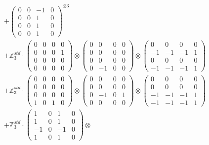 \documentclass{article}
\begin{document}
{\begin{align}
        &+ \label{Rs16-Rc11-Solution-27-c16} \begin{pmatrix} 0 & 0 & -1 & 0 \\ 0 & 0 & 1 & 0 \\ 0 & 0 & 1 & 0 \\ 0 & 0 & 1 & 0 \end{pmatrix}^{\otimes 3} \\
        &+ \label{Rs16-Rc11-Solution-27-c17} \mathbb{Z}_3^{std} \cdot 
            \begin{pmatrix} 0 & 0 & 0 & 0 \\ 0 & 0 & 0 & 1 \\ 0 & 0 & 0 & 0 \\ 0 & 0 & 0 & 0 \end{pmatrix} \otimes 
            \begin{pmatrix} 0 & 0 & 0 & 0 \\ 0 & 0 & 0 & 0 \\ 0 & 0 & 0 & 0 \\ 0 & -1 & 0 & 0 \end{pmatrix} \otimes 
            \begin{pmatrix} 0 & 0 & 0 & 0 \\ -1 & -1 & -1 & 1 \\ 0 & 0 & 0 & 0 \\ -1 & -1 & -1 & 1 \end{pmatrix} \\ 
        &+ \label{Rs16-Rc11-Solution-27-c18} \mathbb{Z}_3^{std} \cdot 
            \begin{pmatrix} 0 & 0 & 0 & 0 \\ 0 & 0 & 0 & 0 \\ 0 & 0 & 0 & 0 \\ 1 & 0 & 1 & 0 \end{pmatrix} \otimes 
            \begin{pmatrix} 0 & 0 & 0 & 0 \\ 0 & 0 & 0 & 0 \\ 0 & -1 & 0 & 1 \\ 0 & 0 & 0 & 0 \end{pmatrix} \otimes 
            \begin{pmatrix} 0 & 0 & 0 & 0 \\ 0 & 0 & 0 & 0 \\ -1 & -1 & -1 & 1 \\ -1 & -1 & -1 & 1 \end{pmatrix} \\ 
        &+ \label{Rs16-Rc11-Solution-27-c19} \mathbb{Z}_3^{std} \cdot 
            \begin{pmatrix} 1 & 0 & 1 & 0 \\ 1 & 0 & 1 & 0 \\ -1 & 0 & -1 & 0 \\ 1 & 0 & 1 & 0 \end{pmatrix} \otimes 

\end{align}}
\end{document}
